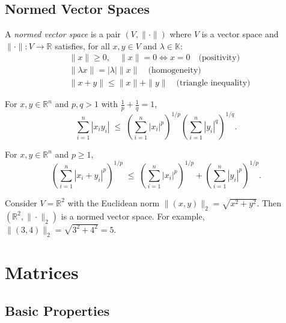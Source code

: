 \subsection{Normed Vector Spaces}

\begin{definition}
A \emph{normed vector space} is a pair $(V,\|\cdot\|)$ where $V$ is a vector space and $\|\cdot\|: V \to \mathbb{R}$ satisfies, for all $x,y \in V$ and $\lambda \in \mathbb{K}$:
\begin{align}
& \|x\| \geq 0, \quad \|x\| = 0 \iff x=0 \quad \text{(positivity)} \\
& \|\lambda x\| = |\lambda| \|x\| \quad \text{(homogeneity)} \\
& \|x+y\| \leq \|x\| + \|y\| \quad \text{(triangle inequality)}
\end{align}
\end{definition}

\begin{theorem}
For $x,y \in \mathbb{R}^n$ and $p,q > 1$ with $\tfrac{1}{p}+\tfrac{1}{q}=1$,  
\[
\sum_{i=1}^n |x_i y_i| \;\leq\; \left( \sum_{i=1}^n |x_i|^p \right)^{1/p} 
\left( \sum_{i=1}^n |y_i|^q \right)^{1/q}.
\]
\end{theorem}

\begin{theorem}
For $x,y \in \mathbb{R}^n$ and $p \geq 1$,  
\[
\left( \sum_{i=1}^n |x_i+y_i|^p \right)^{1/p} \;\leq\; 
\left( \sum_{i=1}^n |x_i|^p \right)^{1/p} + 
\left( \sum_{i=1}^n |y_i|^p \right)^{1/p}.
\]
\end{theorem}

\begin{example}
Consider $V=\mathbb{R}^2$ with the Euclidean norm $\|(x,y)\|_2=\sqrt{x^2+y^2}$.  
Then $(\mathbb{R}^2,\|\cdot\|_2)$ is a normed vector space.  
For example, $\|(3,4)\|_2=\sqrt{3^2+4^2}=5$.
\end{example}

\section{Matrices}

\subsection{Basic Properties}

